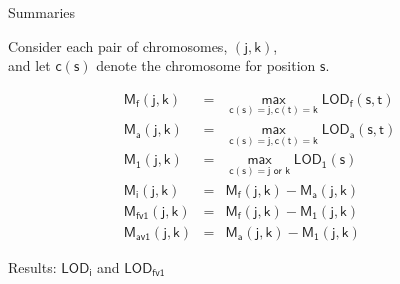 \documentclass[aspectratio=169,12pt,t]{beamer}
\newcommand{\lod}{\text{LOD}}
\newcommand{\M}{\text{M}}
\begin{document}
\begin{frame}{Summaries}

\vspace{15mm}


\hfill \begin{minipage}[t]{10in}
Consider each pair of chromosomes, {\lolit $\mathsf{(j, k)}$}, \\
and let {\lolit $\mathsf{c(s)}$} denote the chromosome for
  position {\lolit $\mathsf{s}$}.

\vspace{5mm}

\hspace{1in}
\begin{minipage}{6in}
{\lolit
\begin{eqnarray*}
\mathsf{\M_f(j,k)}& = &\mathsf{ \max_{c(s)=j, c(t)=k} \lod_f(s,t)} \\[12pt]
\mathsf{\M_a(j,k)}& = &\mathsf{ \max_{c(s)=j, c(t)=k} \lod_a(s,t)} \\[12pt]
\mathsf{\M_1(j,k)}& = &\mathsf{ \max_{c(s)=j \text{ or } k} \lod_1(s)} \\[36pt]
\mathsf{\M_i(j,k)}& = &\mathsf{ \M_f(j,k) - \M_a(j,k)}\\[12pt]
\mathsf{\M_{fv1}(j,k)}& = &\mathsf{ \M_f(j,k) - \M_1(j,k)}\\[12pt]
\mathsf{\M_{av1}(j,k)}& = &\mathsf{ \M_a(j,k) - \M_1(j,k)}
\end{eqnarray*}
}
\end{minipage}
\end{minipage}

\end{frame}








\begin{frame}[c]{Results: $\mathsf{\lod_i}$ and $\mathsf{\lod_{fv1}}$}


\end{frame}
\end{document}
